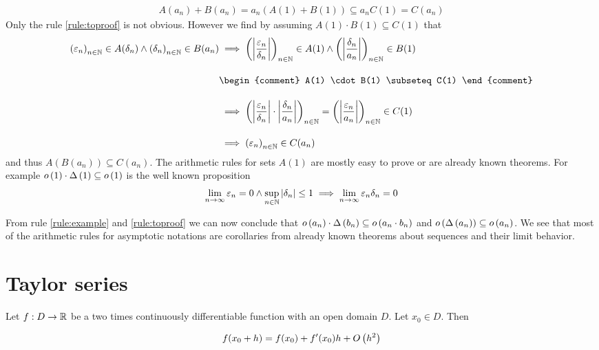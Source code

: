 \begin{align}
  A(a_n) + B(a_n) = a_n (A(1)+B(1)) \subseteq a_n C(1) = C(a_n)
\end{align}
Only the rule \ref{rule:toproof} is not obvious. However we find by assuming $A(1) \cdot B(1) \subseteq C(1)$ that
\begin{align}
  \seq{\epsilon_n} \in A(\delta_n) \land \seq{\delta_n} \in B(a_n) & \implies \seq{\abs{\frac{\epsilon_n}{\delta_n}}} \in A(1) \land \seq{\abs{\frac{\delta_n}{a_n}}} \in B(1) \bnl
  &
  \begin{comment}
    A(1) \cdot B(1) \subseteq C(1)
  \end{comment} \bnl
  & \implies \seq{\abs{\frac{\epsilon_n}{\delta_n}} \cdot \abs{\frac{\delta_n}{a_n}}} = \seq{\abs{\frac{\epsilon_n}{a_n}}} \in C(1) \bnl
  & \implies \seq{\epsilon_n} \in C(a_n)
\end{align}
and thus $A(B(a_n))\subseteq C(a_n)$. The arithmetic rules for sets $A(1)$ are mostly easy to prove or are already known theorems. For example $o\left( {1} \right)\cdot\Delta\left( {1} \right) \subseteq o\left( {1} \right)$ is the well known proposition
\begin{align}
  \lim_{n\to\infty} \varepsilon_n = 0 \land \sup_{n\in\mathbb N} \left|{\delta_n}\right| \le 1 \implies \lim_{n\to\infty} \varepsilon_n \delta_n = 0
\end{align}

From rule \ref{rule:example} and \ref{rule:toproof} we can now conclude that $o\left( {a_n} \right) \cdot \Delta\left( {b_n} \right) \subseteq o\left( {a_n \cdot b_n} \right)$ and $o\left( {\Delta\left( {a_n} \right)} \right) \subseteq o\left( {a_n} \right)$. We see that most of the arithmetic rules for asymptotic notations are corollaries from already known theorems about sequences and their limit behavior.

\section{Taylor series}

\begin{theorem}
  Let $f:D\to\mathbb R$ be a two times continuously differentiable function with an open domain $D$. Let $x_0\in D$. Then

  \begin{align}
    f(x_0+h) = f(x_0) + f'(x_0) h + O\left( {h^2} \right)
  \end{align}
\end{theorem}

